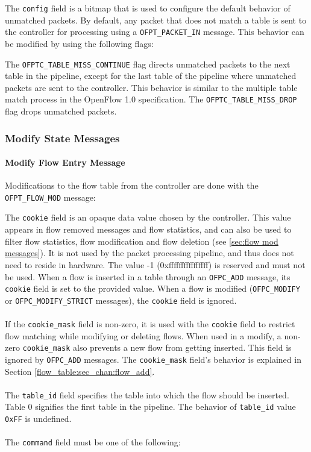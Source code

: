 The \verb|config| field is a bitmap that is used to configure the default behavior of unmatched packets.  By default, any packet that does not match a table is sent to the controller for processing using a \verb|OFPT_PACKET_IN| message.  This behavior can be modified by using the following flags:


The \verb|OFPTC_TABLE_MISS_CONTINUE| flag directs unmatched packets to the next table in the pipeline, except for the last table of the pipeline where unmatched packets are sent to the controller.  This behavior is similar to the multiple table match process in the OpenFlow 1.0 specification. The \verb|OFPTC_TABLE_MISS_DROP| flag drops unmatched packets.

\subsubsection{Modify State Messages}
\paragraph{Modify Flow Entry Message}
Modifications to the flow table from the controller are done with the \verb|OFPT_FLOW_MOD| message:


The \verb|cookie| field is an opaque data value chosen by the controller.  This value appears in flow removed messages and flow statistics, and can also be used to filter flow statistics, flow modification and flow deletion (see \ref{sec:flow mod messages}). It is not used by the packet processing pipeline, and thus does not need to reside in hardware.  The value -1 (0xffffffffffffffff) is reserved and must not be used. When a flow is inserted in a table through an \verb|OFPC_ADD| message, its \verb|cookie| field is set to the provided value. When a flow is modified (\verb|OFPC_MODIFY| or \verb|OFPC_MODIFY_STRICT| messages), the \verb|cookie| field is ignored.
\\\\
If the \verb|cookie_mask| field is non-zero, it is used with the \verb|cookie| field to restrict flow matching while modifying or deleting flows.  When used in a modify, a non-zero \verb|cookie_mask| also prevents a new flow from getting inserted. This field is ignored by \verb|OFPC_ADD| messages. The \verb|cookie_mask| field's behavior is explained in Section \ref{flow_table:sec_chan:flow_add}.
\\\\
The \verb|table_id| field specifies the table into which the flow should be inserted.
Table 0 signifies the first table in the pipeline. The behavior of \verb|table_id| value \verb|0xFF| is undefined.
\\\\
The \verb|command| field must be one of the following:

